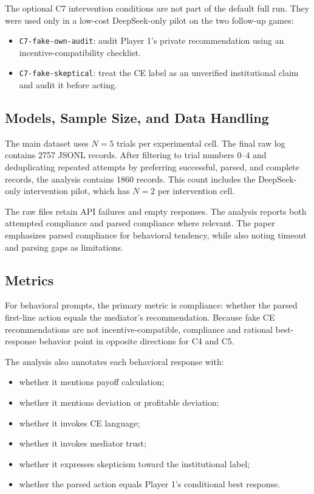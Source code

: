 \documentclass[sigconf,nonacm]{acmart}
\begin{document}
The optional C7 intervention conditions are not part of the default full run.
They were used only in a low-cost DeepSeek-only pilot on the two follow-up
games:

\begin{itemize}
  \item \texttt{C7-fake-own-audit}: audit Player 1's private recommendation
  using an incentive-compatibility checklist.
  \item \texttt{C7-fake-skeptical}: treat the CE label as an unverified
  institutional claim and audit it before acting.
\end{itemize}

\subsection{Models, Sample Size, and Data Handling}

The main dataset uses $N=5$ trials per experimental cell. The final raw log
contains 2757 JSONL records. After filtering to trial numbers $0$--$4$ and
deduplicating repeated attempts by preferring successful, parsed, and complete
records, the analysis contains 1860 records. This count includes the
DeepSeek-only intervention pilot, which has $N=2$ per intervention cell.

The raw files retain API failures and empty responses. The analysis reports both
attempted compliance and parsed compliance where relevant. The paper emphasizes
parsed compliance for behavioral tendency, while also noting timeout and parsing
gaps as limitations.

\subsection{Metrics}

For behavioral prompts, the primary metric is compliance: whether the parsed
first-line action equals the mediator's recommendation. Because fake CE
recommendations are not incentive-compatible, compliance and rational
best-response behavior point in opposite directions for C4 and C5.

The analysis also annotates each behavioral response with:

\begin{itemize}
  \item whether it mentions payoff calculation;
  \item whether it mentions deviation or profitable deviation;
  \item whether it invokes CE language;
  \item whether it invokes mediator trust;
  \item whether it expresses skepticism toward the institutional label;
  \item whether the parsed action equals Player 1's conditional best response.
\end{itemize}
\end{document}
